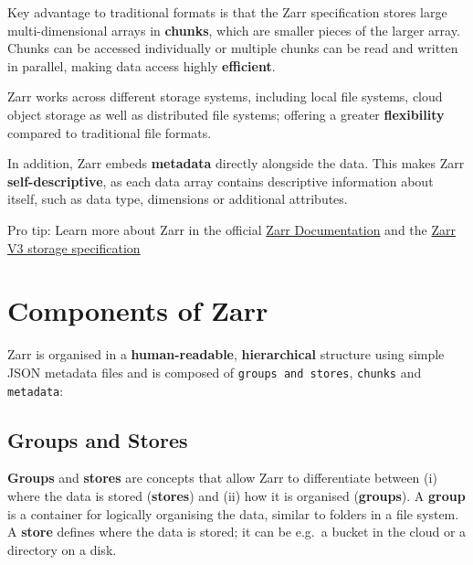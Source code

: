 \documentclass[
  letterpaper,
  DIV=11,
  numbers=noendperiod]{scrreprt}
\begin{document}
Key advantage to traditional formats is that the Zarr specification
stores large multi-dimensional arrays in \textbf{chunks}, which are
smaller pieces of the larger array. Chunks can be accessed individually
or multiple chunks can be read and written in parallel, making data
access highly \textbf{efficient}.

Zarr works across different storage systems, including local file
systems, cloud object storage as well as distributed file systems;
offering a greater \textbf{flexibility} compared to traditional file
formats.

In addition, Zarr embeds \textbf{metadata} directly alongside the data.
This makes Zarr \textbf{self-descriptive}, as each data array contains
descriptive information about itself, such as data type, dimensions or
additional attributes.

\begin{tcolorbox}[enhanced jigsaw, coltitle=black, colback=white, leftrule=.75mm, colbacktitle=quarto-callout-note-color!10!white, titlerule=0mm, title=\textcolor{quarto-callout-note-color}{\faInfo}\hspace{0.5em}{Note}, rightrule=.15mm, bottomrule=.15mm, bottomtitle=1mm, toptitle=1mm, arc=.35mm, toprule=.15mm, left=2mm, opacityback=0, colframe=quarto-callout-note-color-frame, opacitybacktitle=0.6, breakable]

Pro tip: Learn more about Zarr in the official
\href{https://zarr.dev/}{Zarr Documentation} and the
\href{https://zarr-specs.readthedocs.io/en/latest/v3/core/index.html}{Zarr
V3 storage specification}

\end{tcolorbox}

\section{Components of Zarr}\label{components-of-zarr}

Zarr is organised in a \textbf{human-readable}, \textbf{hierarchical}
structure using simple JSON metadata files and is composed of
\texttt{groups\ and\ stores}, \texttt{chunks} and \texttt{metadata}:

\subsection{Groups and Stores}\label{groups-and-stores}

\textbf{Groups} and \textbf{stores} are concepts that allow Zarr to
differentiate between (i) where the data is stored (\textbf{stores}) and
(ii) how it is organised (\textbf{groups}). A \textbf{group} is a
container for logically organising the data, similar to folders in a
file system. A \textbf{store} defines where the data is stored; it can
be e.g.~a bucket in the cloud or a directory on a disk.
\end{document}
